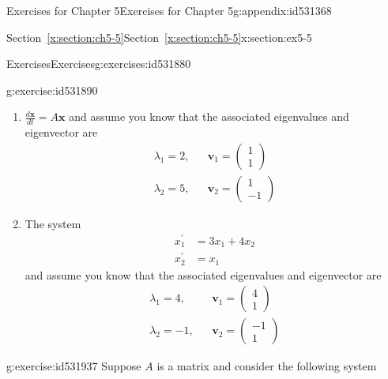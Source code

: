 \documentclass[oneside,10pt,]{book}
\newcommand{\xreffont}{\relax}
\numberwithin{equation}{section}
\numberwithin{equation}{section}
\newcommand{\amp}{&}
\begin{document}
\begin{appendixptx}{Exercises for Chapter 5}{}{Exercises for Chapter 5}{}{}{g:appendix:id531368}
\begin{sectionptx}{Section~{\xreffont\ref*{x:section:ch5-5}}}{}{Section~{\xreffont\ref*{x:section:ch5-5}}}{}{}{x:section:ex5-5}
\begin{exercises-subsection-numberless}{Exercises}{}{Exercises}{}{}{g:exercises:id531880}
\begin{divisionexercise}{1}{}{}{g:exercise:id531890}
\begin{enumerate}[label=(\alph*)]
\begin{equation*}
\begin{array}{ccc}
\begin{array}{c}
1\\
1
\end{array}\right)\\
\lambda_{2}=-3, \amp  \amp \mathbf{v}_{2}=\left(\begin{array}{c}
1\\
-4
\end{array}\right)
\end{array}
\end{equation*}
%
\item{}\({\displaystyle \frac{d\mathbf{x}}{dt}=A\mathbf{x}}\) and assume you know that the associated eigenvalues and eigenvector are%
\begin{equation*}
\begin{array}{ccc}
\lambda_{1}=2, \amp  \amp \mathbf{v}_{1}=\left(\begin{array}{c}
1\\
1
\end{array}\right)\\
\lambda_{2}=5, \amp  \amp \mathbf{v}_{2}=\left(\begin{array}{c}
1\\
-1
\end{array}\right)
\end{array}
\end{equation*}
%
\item{}The system%
\begin{align*}
x_{1}^{\prime} \amp =3x_{1}+4x_{2}\\
x_{2}^{\prime} \amp =x_{1} 
\end{align*}
and assume you know that the associated eigenvalues and eigenvector are%
\begin{equation*}
\begin{array}{ccc}
\lambda_{1}=4, \amp  \amp \mathbf{v}_{1}=\left(\begin{array}{c}
4\\
1
\end{array}\right)\\
\lambda_{2}=-1, \amp  \amp \mathbf{v}_{2}=\left(\begin{array}{c}
-1\\
1
\end{array}\right)
\end{array}
\end{equation*}
%
\end{enumerate}
\end{divisionexercise}%
\begin{divisionexercise}{2}{}{}{g:exercise:id531937}%
Suppose \(A\) is a matrix and consider the following system%

\end{divisionexercise}
\end{exercises-subsection-numberless}
\end{sectionptx}
\end{appendixptx}
\end{document}
